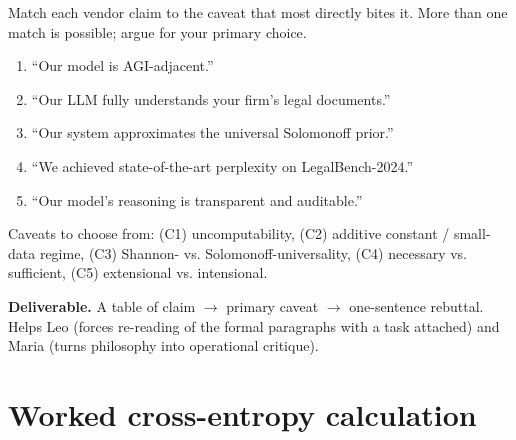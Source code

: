 \documentclass[12pt,a4paper]{article}
\theoremstyle{plain}
\theoremstyle{definition}
\begin{document}
\begin{activity}[title={Activity 8.4 --- Claim-to-caveat matching}]
Match each vendor claim to the caveat that most directly bites it.
More than one match is possible; argue for your primary choice.

\begin{enumerate}[leftmargin=1.4em,itemsep=2pt]
  \item ``Our model is AGI-adjacent.''
  \item ``Our LLM fully understands your firm's legal documents.''
  \item ``Our system approximates the universal Solomonoff prior.''
  \item ``We achieved state-of-the-art perplexity on
        LegalBench-2024.''
  \item ``Our model's reasoning is transparent and auditable.''
\end{enumerate}

Caveats to choose from: (C1) uncomputability, (C2) additive constant
/ small-data regime, (C3) Shannon- vs. Solomonoff-universality,
(C4) necessary vs. sufficient, (C5) extensional vs. intensional.

\textbf{Deliverable.} A table of claim $\to$ primary caveat $\to$
one-sentence rebuttal. Helps Leo (forces re-reading of the formal
paragraphs with a task attached) and Maria (turns philosophy into
operational critique).
\end{activity}


\appendix

\section{Worked cross-entropy calculation}
\label{app:ce-worked}
\end{document}
